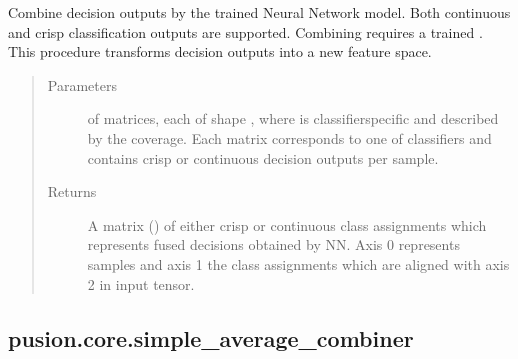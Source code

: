 \documentclass[letterpaper,10pt,english]{sphinxmanual}
\begin{document}
\begin{fulllineitems}
\begin{fulllineitems}
\label{\detokenize{pusion.core.neural_network_combiner:pusion.core.neural_network_combiner.CRNeuralNetworkCombiner.combine}}
\sphinxAtStartPar
Combine decision outputs by the trained Neural Network model. Both continuous and crisp classification outputs
are supported. Combining requires a trained {\hyperref[\detokenize{pusion.core.neural_network_combiner:pusion.core.neural_network_combiner.NeuralNetworkCombiner}]{}}. This procedure transforms decision
outputs into a new feature space.
\begin{quote}\begin{description}
\item[{Parameters}] \leavevmode
\sphinxAtStartPar
{} \textendash{}  of  matrices, each of shape ,
where  is classifier\sphinxhyphen{}specific and described by the coverage. Each matrix corresponds to
one of  classifiers and contains crisp or continuous decision outputs per sample.

\item[{Returns}] \leavevmode
\sphinxAtStartPar
A matrix () of either crisp or continuous class assignments which represents fused
decisions obtained by NN. Axis 0 represents samples and axis 1 the class assignments which are aligned
with axis 2 in  input tensor.

\end{description}\end{quote}

\end{fulllineitems}


\end{fulllineitems}



\subsection{pusion.core.simple\_average\_combiner}
\label{\detokenize{pusion.core.simple_average_combiner:module-pusion.core.simple_average_combiner}}\label{\detokenize{pusion.core.simple_average_combiner:pusion-core-simple-average-combiner}}\label{\detokenize{pusion.core.simple_average_combiner:avg-cref}}\label{\detokenize{pusion.core.simple_average_combiner::doc}}
\end{document}
